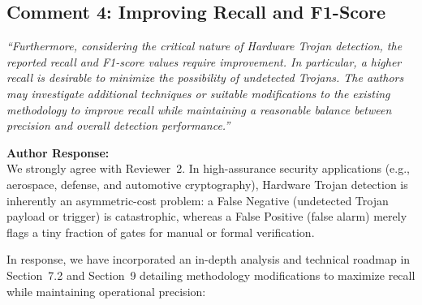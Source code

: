 \documentclass[11pt,a4paper]{article}
\newcommand{\reviewercomment}[1]{\vspace{4pt}\noindent\textcolor{revcomment}{\textit{``#1''}}\vspace{4pt}}
\newcommand{\authorresponse}{\noindent\textbf{Author Response:}}
\begin{document}
\subsection*{Comment 4: Improving Recall and F1-Score}

\reviewercomment{Furthermore, considering the critical nature of Hardware Trojan detection, the reported recall and F1-score values require improvement. In particular, a higher recall is desirable to minimize the possibility of undetected Trojans. The authors may investigate additional techniques or suitable modifications to the existing methodology to improve recall while maintaining a reasonable balance between precision and overall detection performance.}

\authorresponse\\
We strongly agree with Reviewer~2. In high-assurance security applications (e.g., aerospace, defense, and automotive cryptography), Hardware Trojan detection is inherently an asymmetric-cost problem: a False Negative (undetected Trojan payload or trigger) is catastrophic, whereas a False Positive (false alarm) merely flags a tiny fraction of gates for manual or formal verification. 

In response, we have incorporated an in-depth analysis and technical roadmap in Section~7.2 and Section~9 detailing methodology modifications to maximize recall while maintaining operational precision:
\end{document}
